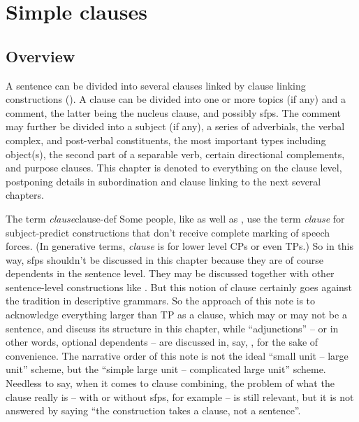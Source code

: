 \documentclass[UTF8, a4paper, oneside, scheme=plain]{ctexrep}
\newcommand*{\citepage}[1]{pp.~{#1}}
\newcommand*{\term}[1]{\emph{#1}}
\begin{document}
\chapter{Simple clauses}

\section{Overview}

A sentence can be divided into several clauses linked by clause linking constructions 
().
A clause can be divided into
one or more topics (if any) and a comment,
the latter being the nucleus clause,
and possibly \ac{sfp}s.
The comment may further be divided into a subject (if any),
a series of adverbials, 
the verbal complex, and post-verbal constituents,
the most important types including object(s), 
the second part of a separable verb,
certain directional complements,
and purpose clauses.
This chapter is denoted to everything on the clause level,
postponing details in subordination and clause linking to the next several chapters.

\begin{infobox}{The term \term{clause}}{clause-def}
    Some people, like \citet[\citepage{140}]{deng2010formal}
    as well as \citet{dixon2009basic},
    use the term \term{clause} for subject-predict constructions 
    that don't receive complete marking of speech forces.
    (In generative terms, \term{clause} is for lower level CPs or even TPs.)
    So in this way, \acs{sfp}s shouldn't be discussed in this chapter because 
    they are of course dependents in the sentence level.
    They may be discussed together with other sentence-level constructions like .
    But this notion of clause certainly goes against the tradition in descriptive grammars.
    So the approach of this note is to acknowledge everything larger than TP as a clause,
    which may or may not be a sentence,
    and discuss its structure in this chapter,
    while ``adjunctions'' -- or in other words, optional dependents -- 
    are discussed in, say, ,
    for the sake of convenience.
    The narrative order of this note is not the ideal ``small unit -- large unit'' scheme,
    but the ``simple large unit -- complicated large unit'' scheme.
    Needless to say,
    when it comes to clause combining, 
    the problem of what the clause really is -- with or without \ac{sfp}s, for example --
    is still relevant,
    but it is not answered by saying ``the construction takes a clause, not a sentence''.
\end{infobox}
\end{document}
